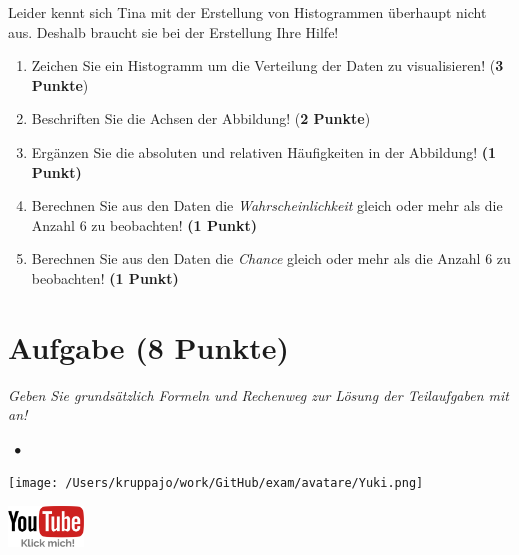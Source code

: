 \documentclass[a4paper, 9pt]{scrartcl}\usepackage[]{graphicx}\usepackage[]{xcolor}
\begin{document}
Leider kennt sich Tina mit der Erstellung von Histogrammen überhaupt nicht aus. Deshalb braucht sie bei der Erstellung Ihre Hilfe!

\begin{enumerate}
\item Zeichen Sie ein Histogramm um die Verteilung der Daten zu visualisieren! (\textbf{3 Punkte})
\item Beschriften Sie die Achsen der Abbildung! (\textbf{2 Punkte})
\item Ergänzen Sie die absoluten und relativen Häufigkeiten in der
  Abbildung! \textbf{(1 Punkt)}
\item Berechnen Sie aus den Daten die \textit{Wahrscheinlichkeit}
  gleich oder mehr als die Anzahl 6 zu beobachten! \textbf{(1
    Punkt)}
\item Berechnen Sie aus den Daten die \textit{Chance} gleich oder mehr
  als die Anzahl 6 zu beobachten! \textbf{(1 Punkt)}
\end{enumerate}

 
\clearpage

\section{Aufgabe \hfill (8 Punkte)}

\textit{Geben Sie grundsätzlich Formeln und Rechenweg zur Lösung der Teilaufgaben mit an!} \\[1Ex]
 

 
\ifcollection
\begin{flushright}
\tiny\vspace{-3Ex}
\textbf{\examinhaltstart}
\exammodulestatversuch $\;\bullet$
\exammodulebiostat
\vspace{-4Ex}
\end{flushright}
\begin{minipage}[t]{0.5\textwidth}
\texttt{[image: /Users/kruppajo/work/GitHub/exam/avatare/Yuki.png]}
\end{minipage}
\begin{minipage}[t]{0.5\textwidth}
\hfill
\href{https://youtu.be/ORHSPTCdfeY}{\includegraphics[width = 2cm]{img/youtube}}
\end{minipage}
\vspace{-3ex}
\fi
\end{document}
